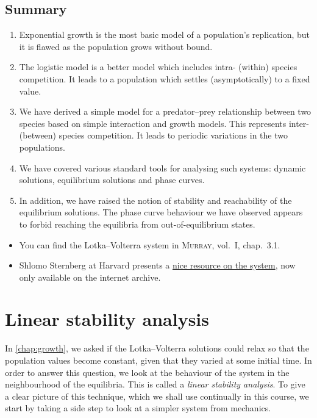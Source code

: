 \documentclass[main.tex]{subfiles}
\begin{document}
\section*{Summary}
\begin{enumerate}
\item{Exponential growth is the most basic model of a population's replication, but it is flawed as the population grows without bound.}
\item{The logistic model is a better model which includes intra- (within) species competition. It leads to a population which settles (asymptotically) to a fixed value.}
\item{We have derived a simple model for a predator--prey relationship between two species based on simple interaction and growth models. This represents inter- (between) species competition. It leads to periodic variations in the two populations.}
\item{We have covered various standard tools for analysing such systems: dynamic solutions, equilibrium solutions and phase curves.}
\item{In addition, we have raised the notion of stability and reachability of the equilibrium solutions. The phase curve behaviour we have observed appears to forbid reaching the equilibria from out-of-equilibrium states.}
\end{enumerate}

\begin{extra-reading}
\begin{itemize}
	\item You can find the Lotka--Volterra system in \textsc{Murray}, vol.~I, chap.~3.1.
	\item Shlomo Sternberg at Harvard presents a \href{https://web.archive.org/web/20180827011218/http://www.math.harvard.edu/library/sternberg/slides/11809LV.pdf}{nice resource on the system}, now only available on the internet archive.
\end{itemize}
\end{extra-reading}


\chapter{Linear stability analysis}
\label{chap:pendulum}

In \cref{chap:growth}, we asked if the Lotka--Volterra solutions could relax so that the population values become constant, given that they varied at some initial time. In order to answer this question, we look at the behaviour of the system in the neighbourhood of the equilibria. This is called a \emph{linear stability analysis}. To give a clear picture of this technique, which we shall use continually in this course, we start by taking a side step to look at a simpler system from mechanics. 
\end{document}
